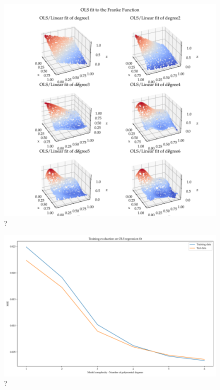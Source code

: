 \documentclass[11pt]{article}
\begin{document}
\begin{figure}
  \centering
  \includegraphics[scale=0.85]{figures/franke_function_fit_OLS.pdf}
  \caption{?}
  \label{fig: ?}
\end{figure}

\begin{figure}
  \centering
  \includegraphics[scale=0.85]{figures/Franke_Function_OLS_fit_evaluation.pdf.pdf}
  \caption{?}
  \label{fig: ?}
\end{figure}
\end{document}
